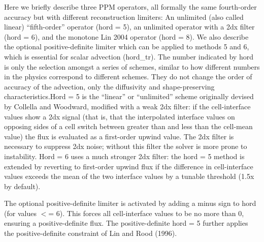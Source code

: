 Here we briefly describe three P\-P\-M operators, all formally the same fourth-\/order accuracy but with different reconstruction limiters\-: An unlimited (also called linear) “fifth-\/order” operator (hord = 5), an unlimited operator with a 2dx filter (hord = 6), and the monotone Lin 2004 operator (hord = 8). We also describe the optional positive-\/definite limiter which can be applied to methods 5 and 6, which is essential for scalar advection (hord\-\_\-tr). ​\-The number indicated by hord is only the selection amongst a series of schemes, ​similar to how different numbers in the physics correspond to different schemes. ​\-They do not change the order of accuracy of the advection, only the diffusivity and shape-\/preserving characteristics.\-Hord = 5 is the “linear” or “unlimited” scheme originally devised by Collella and Woodward, modified with a weak 2dx filter\-: if the cell-\/interface values show a 2dx signal (that is, that the interpolated interface values on opposing sides of a cell switch between greater than and less than the cell-\/mean value) the flux is evaluated as a first-\/order upwind value. The 2dx filter is necessary to suppress 2dx noise; without this filter the solver is more prone to instability. Hord = 6 uses a much stronger 2dx filter\-: the hord = 5 method is extended by reverting to first-\/order upwind flux if the difference in cell-\/interface values exceeds the mean of the two interface values by a tunable threshold (1.\-5x by default).

The optional positive-\/definite limiter is activated by adding a minus sign to hord (for values $<$= 6). This forces all cell-\/interface values to be no more than 0, ensuring a positive-\/definite flux. The positive-\/definite hord = 5 further applies the positive-\/definite constraint of Lin and Rood (1996). 